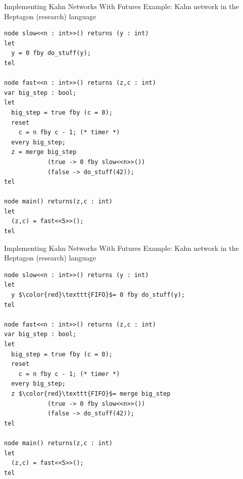 \documentclass[xcolor=dvipsnames,9pt,mathserif]{beamer}
\begin{document}
\begin{frame}[fragile]{Implementing Kahn Networks With Futures}
  Example: Kahn network in the Heptagon (research) language

  \medskip
\begin{lstlisting}
node slow<<n : int>>() returns (y : int)
let
  y = 0 fby do_stuff(y);
tel

node fast<<n : int>>() returns (z,c : int)
var big_step : bool;
let
  big_step = true fby (c = 0);
  reset
    c = n fby c - 1; (* timer *)
  every big_step;
  z = merge big_step
            (true -> 0 fby slow<<n>>())
            (false -> do_stuff(42));
tel

node main() returns(z,c : int)
let
  (z,c) = fast<<5>>();
tel
  \end{lstlisting}
\end{frame}

\begin{frame}[fragile]{Implementing Kahn Networks With Futures}
  Example: Kahn network in the Heptagon (research) language

  \medskip
\begin{lstlisting}
node slow<<n : int>>() returns (y : int)
let
  y $\color{red}\texttt{FIFO}$= 0 fby do_stuff(y);
tel

node fast<<n : int>>() returns (z,c : int)
var big_step : bool;
let
  big_step = true fby (c = 0);
  reset
    c = n fby c - 1; (* timer *)
  every big_step;
  z $\color{red}\texttt{FIFO}$= merge big_step
            (true -> 0 fby slow<<n>>())
            (false -> do_stuff(42));
tel

node main() returns(z,c : int)
let
  (z,c) = fast<<5>>();
tel
  \end{lstlisting}
\end{frame}
\end{document}
